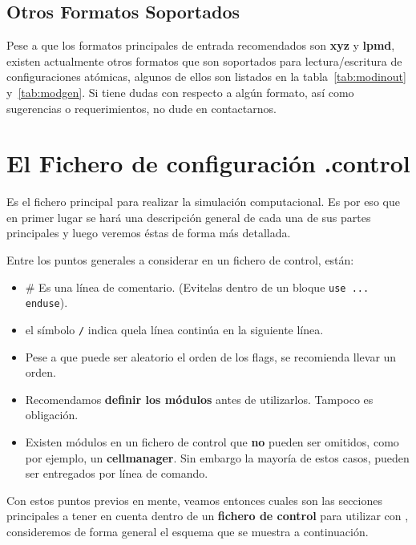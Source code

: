 \subsection{Otros Formatos Soportados}

Pese a que los formatos principales de entrada recomendados son \textbf{xyz} y \textbf{lpmd}, existen actualmente otros formatos que son soportados para lectura/escritura de configuraciones at\'omicas, algunos de ellos son listados en la tabla~\ref{tab:modinout} y~\ref{tab:modgen}. Si tiene dudas con respecto a alg\'un formato, as\'i como sugerencias o requerimientos, no dude en contactarnos.

\section{El Fichero de configuraci\'on .control}

Es el fichero principal para realizar la simulaci\'on computacional. Es por eso que en primer lugar se har\'a una descripci\'on general de cada una de sus partes principales y luego veremos \'estas de forma m\'as detallada.

Entre los puntos generales a considerar en un fichero de control, est\'an:

\begin{itemize}
 \item \# Es una l\'inea de comentario. (Evitelas dentro de un bloque \texttt{use ... enduse}).
 \item el s\'imbolo \verb|/| indica quela l\'inea contin\'ua en la siguiente l\'inea.
 \item Pese a que puede ser aleatorio el orden de los flags, se recomienda llevar un orden.
 \item Recomendamos \textbf{definir los m\'odulos} antes de utilizarlos. Tampoco es obligaci\'on.
 \item Existen m\'odulos en un fichero de control que \textbf{no} pueden ser omitidos, como por ejemplo, un \textbf{cellmanager}. Sin embargo la mayor\'ia de estos casos, pueden ser entregados por l\'inea de comando.
\end{itemize}

Con estos puntos previos en mente, veamos entonces cuales son las secciones principales a tener en cuenta dentro de un \textbf{fichero de control} para utilizar con {\lpmd}, consideremos de forma general el esquema que se muestra a continuaci\'on.

